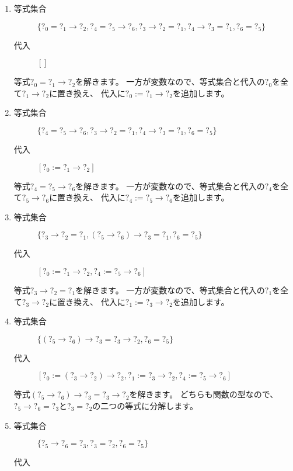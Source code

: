 \begin{enumerate}
  \item
    \begin{description}
      \item[等式集合]
       $\{?_0 = ?_1 \to ?_2, ?_4 = ?_5 \to ?_6, ?_3 \to ?_2 = ?_1, ?_4 \to ?_3 = ?_1, ?_6 = ?_5\}$
      \item[代入]
       $[]$
    \end{description}
    等式$?_0 = ?_1 \to ?_2$を解きます。
    一方が変数なので、等式集合と代入の$?_0$を全て$?_1 \to ?_2$に置き換え、
    代入に$?_0 := ?_1 \to ?_2$を追加します。
  \item
    \begin{description}
      \item[等式集合]
       $\{?_4 = ?_5 \to ?_6, ?_3 \to ?_2 = ?_1, ?_4 \to ?_3 = ?_1, ?_6 = ?_5\}$
      \item[代入]
       $[?_0 := ?_1 \to ?_2]$
    \end{description}
    等式$?_4 = ?_5 \to ?_6$を解きます。
    一方が変数なので、等式集合と代入の$?_4$を全て$?_5 \to ?_6$に置き換え、
    代入に$?_4 := ?_5 \to ?_6$を追加します。
  \item
    \begin{description}
      \item[等式集合]
       $\{?_3 \to ?_2 = ?_1, (?_5 \to ?_6) \to ?_3 = ?_1, ?_6 = ?_5\}$
      \item[代入]
       $[?_0 := ?_1 \to ?_2, ?_4 := ?_5 \to ?_6]$
    \end{description}
    等式$?_3 \to ?_2 = ?_1$を解きます。
    一方が変数なので、等式集合と代入の$?_1$を全て$?_3 \to ?_2$に置き換え、
    代入に$?_1 := ?_3 \to ?_2$を追加します。
  \item
    \begin{description}
      \item[等式集合]
       $\{(?_5 \to ?_6) \to ?_3 = ?_3 \to ?_2, ?_6 = ?_5\}$
      \item[代入]
       $[?_0 := (?_3 \to ?_2) \to ?_2, ?_1 := ?_3 \to ?_2, ?_4 := ?_5 \to ?_6]$
    \end{description}
    等式$(?_5 \to ?_6) \to ?_3 = ?_3 \to ?_2$を解きます。
    どちらも関数の型なので、$?_5 \to ?_6 = ?_3$と$?_3 = ?_2$の二つの等式に分解します。
  \item
    \begin{description}
      \item[等式集合]
       $\{?_5 \to ?_6 = ?_3, ?_3 = ?_2, ?_6 = ?_5\}$
      \item[代入]

\end{description}
\end{enumerate}
